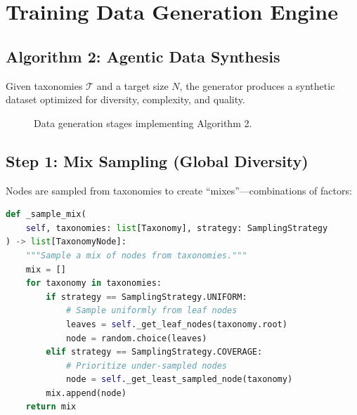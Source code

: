 \chapter{Training Data Generation Engine}
\label{chap:generator}

\section{Algorithm 2: Agentic Data Synthesis}

Given taxonomies $\mathcal{T}$ and a target size $N$, the generator produces a synthetic
dataset optimized for diversity, complexity, and quality.

\begin{figure}[H]
\centering
{}
\caption{Data generation stages implementing Algorithm 2.}
\label{fig:generator-stages}
\end{figure}

\section{Step 1: Mix Sampling (Global Diversity)}

Nodes are sampled from taxonomies to create ``mixes''---combinations of factors:

\begin{lstlisting}[language=Python,caption={Mix sampling (simula\_data\_generator.py, lines 120--150)}]
def _sample_mix(
    self, taxonomies: list[Taxonomy], strategy: SamplingStrategy
) -> list[TaxonomyNode]:
    """Sample a mix of nodes from taxonomies."""
    mix = []
    for taxonomy in taxonomies:
        if strategy == SamplingStrategy.UNIFORM:
            # Sample uniformly from leaf nodes
            leaves = self._get_leaf_nodes(taxonomy.root)
            node = random.choice(leaves)
        elif strategy == SamplingStrategy.COVERAGE:
            # Prioritize under-sampled nodes
            node = self._get_least_sampled_node(taxonomy)
        mix.append(node)
    return mix
\end{lstlisting}

